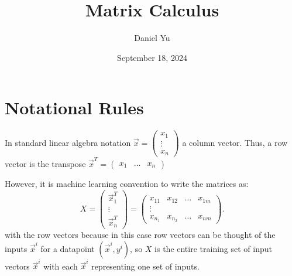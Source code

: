\documentclass[a4paper]{article}
\title{\Huge{Matrix Calculus}}
\author{\huge{Daniel Yu}}
\date{September 18, 2024}
\begin{document}
\maketitle
\newpage%
\section{Notational Rules}
In standard linear algebra notation $\vec{x} = \begin{pmatrix} x_1\\ \vdots\\ x_n \end{pmatrix}$ a column vector. 
Thus, a row vector is the transpose $\vec{x}^T = \begin{pmatrix} x_1 & \ldots & x_n \end{pmatrix} $

However, it is machine learning convention to write the matrices as:
\[
  X = \begin{pmatrix} \vec{x}_1^T\\ \vdots\\ \vec{x}_n^T \end{pmatrix} = \begin{pmatrix} x_{11} & x_{12} & \ldots & x_{1m} \\ \vdots\\ x_{n_1} & x_{n_2} & \ldots & x_{nm} \end{pmatrix}
.\] 
with the row vectors because in this case row vectors can be thought of the inputs $\vec{x}^i$ for a datapoint  $\left( \vec{x}^i, y^i \right)$,
so $X$ is the entire training set of input vectors  $\vec{x}^i$ with each  $\vec{x}^i$ representing one set of inputs.
\end{document}
